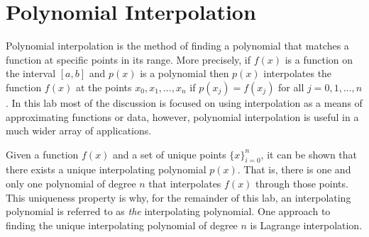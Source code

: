 \label{lab:Polynomial Interpolation}

\section*{Polynomial Interpolation}
Polynomial interpolation is the method of finding a polynomial that matches a function at specific points in its range.
More precisely, if $f(x)$ is a function on the interval $[a,b]$ and $p(x)$ is a polynomial then $p(x)$ interpolates the function $f(x)$ at the points $x_0,x_1,\dots ,x_n$ if $p(x_j)=f(x_j)$ for all $j=0,1,\dots,n$.
In this lab most of the discussion is focused on using interpolation as a means of approximating functions or data, however, polynomial interpolation is useful in a much wider array of applications.

Given a function $f(x)$ and a set of unique points $\{x\}_{i=0}^n$, it can be shown that there exists a unique interpolating polynomial $p(x)$.
That is, there is one and only one polynomial of degree $n$ that interpolates $f(x)$ through those points.
This uniqueness property is why, for the remainder of this lab, an interpolating polynomial is referred to as \emph{the} interpolating polynomial.
One approach to finding the unique interpolating polynomial of degree $n$ is Lagrange interpolation.

